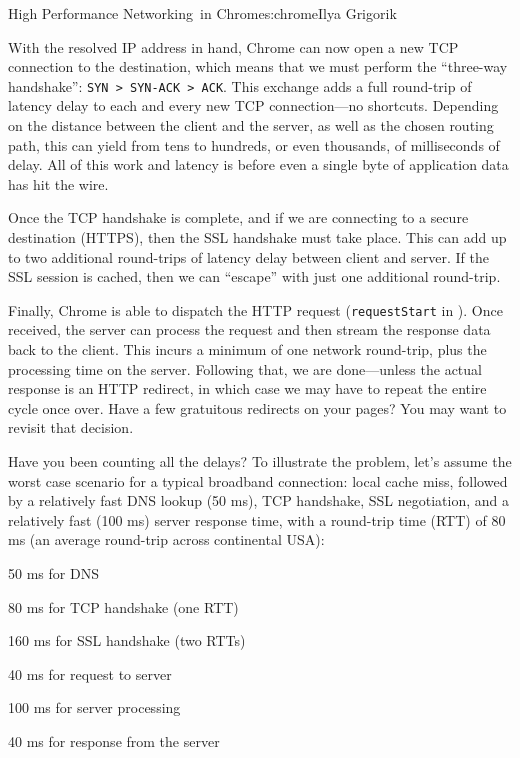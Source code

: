 \begin{aosachapter}{High Performance Networking~in Chrome}{s:chrome}{Ilya Grigorik}

With the resolved IP address in hand, Chrome can now open a new TCP
connection to the destination, which means that we must perform the
``three-way handshake'':
\texttt{SYN \textgreater{} SYN-ACK \textgreater{} ACK}. This exchange
adds a full round-trip of latency delay to each and every new TCP
connection---no shortcuts. Depending on the distance between the client
and the server, as well as the chosen routing path, this can yield from
tens to hundreds, or even thousands, of milliseconds of delay. All of
this work and latency is before even a single byte of application data
has hit the wire.

Once the TCP handshake is complete, and if we are connecting to a secure
destination (HTTPS), then the SSL handshake must take place. This can
add up to two additional round-trips of latency delay between client and
server. If the SSL session is cached, then we can ``escape'' with just
one additional round-trip.

Finally, Chrome is able to dispatch the HTTP request
(\texttt{requestStart} in ). Once
received, the server can process the request and then stream the
response data back to the client. This incurs a minimum of one network
round-trip, plus the processing time on the server. Following that, we
are done---unless the actual response is an HTTP redirect, in which case
we may have to repeat the entire cycle once over. Have a few gratuitous
redirects on your pages? You may want to revisit that decision.

Have you been counting all the delays? To illustrate the problem, let's
assume the worst case scenario for a typical broadband connection: local
cache miss, followed by a relatively fast DNS lookup (50 ms), TCP
handshake, SSL negotiation, and a relatively fast (100 ms) server
response time, with a round-trip time (RTT) of 80 ms (an average
round-trip across continental USA):

\begin{aosaitemize}

\item
  50 ms for DNS
\item
  80 ms for TCP handshake (one RTT)
\item
  160 ms for SSL handshake (two RTTs)
\item
  40 ms for request to server
\item
  100 ms for server processing
\item
  40 ms for response from the server
\end{aosaitemize}


\end{aosachapter}
